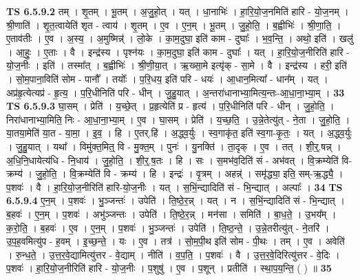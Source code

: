 \documentclass[17pt]{extarticle}
\begin{document}
                  \newline
                                \textbf{ TS 6.5.9.2} \newline
                  तम् । शृ॒तम् । भू॒तम् । अ॒जु॒हो॒त् । यत् । धा॒नाभिः॑ । हा॒रि॒यो॒ज॒नमिति॑ हारि - यो॒ज॒नम् । श्री॒णाति॑ । शृ॒त॒त्वायेति॑ शृत - त्वाय॑ । शृ॒तम् । ए॒व । ए॒न॒म् । भू॒तम् । जु॒हो॒ति॒ । ब॒ह्वीभिः॑ । श्री॒णा॒ति॒ । ए॒ताव॑तीः । ए॒व । अ॒स्य॒ । अ॒मुष्मिन्न्॑ । लो॒के । का॒म॒दुघा॒ इति॑ काम - दुघाः᳚ । भ॒व॒न्ति॒ । अथो॒ इति॑ । खलु॑ । आ॒हुः॒ । ए॒ताः । वै । इन्द्र॑स्य । पृश्न॑यः । का॒म॒दुघा॒ इति॑ काम - दुघाः᳚ । यत् । हा॒रि॒यो॒ज॒नीरिति॑ हारि - यो॒ज॒नीः । इति॑ । तस्मा᳚त् । ब॒ह्वीभिः॑ । श्री॒णी॒या॒त् । ऋ॒ख्सा॒मे इत्यृ॑क् - सा॒मे । वै । इन्द्र॑स्य । हरी॒ इति॑ । सो॒म॒पाना॒विति॑ सोम - पानौ᳚ । तयोः᳚ । प॒रि॒धय॒ इति॑ परि - धयः॑ । आ॒धान॒मित्या᳚ - धान᳚म् । यत् । अप्र॑हृ॒त्येत्यप्र॑ - हृ॒त्य॒ । प॒रि॒धीनिति॑ परि - धीन् । जु॒हु॒यात् । अ॒न्तरा॑धानाभ्या॒मित्य॒न्तः-आ॒धा॒ना॒भ्या॒म् । \textbf{  33} \newline
                  \newline
                                \textbf{ TS 6.5.9.3} \newline
                  घा॒सम् । प्रेति॑ । य॒च्छे॒त् । प्र॒हृत्येति॑ प्र - हृत्य॑ । प॒रि॒धीनिति॑ परि - धीन् । जु॒हो॒ति॒ । निरा॑धानाभ्या॒मिति॒ निः - आ॒धा॒ना॒भ्या॒म् । ए॒व । घा॒सम् । प्रेति॑ । य॒च्छ॒ति॒ । उ॒न्ने॒तेत्यु॑त् - ने॒ता । जु॒हो॒ति॒ । या॒तया॒मेति॑ या॒त - या॒मा॒ । इ॒व॒ । हि । ए॒तर्.हि॑ । अ॒द्ध्व॒र्युः । स्व॒गाकृ॑त॒ इति॑ स्व॒गा-कृ॒तः॒ । यत् । अ॒द्ध्व॒र्युः । जु॒हु॒यात् । यथा᳚ । विमु॑क्त॒मित्॒ वि - मु॒क्त॒म् । पुनः॑ । यु॒नक्ति॑ । ता॒दृक् । ए॒व । तत् । शी॒र्॒.षन्न् । अ॒धि॒नि॒धायेत्य॑धि - नि॒धाय॑ । जु॒हो॒ति॒ । शी॒र्॒.ष॒तः । हि । सः । स॒मभ॑व॒दिति॑ सं - अभ॑वत् । वि॒क्रम्येति॑ वि-क्रम्य॑ । जु॒हो॒ति॒ । वि॒क्रम्येति॑ वि - क्रम्य॑ । हि । इन्द्रः॑ । वृ॒त्रम् । अहन्न्॑ । समृ॑द्ध्या॒ इति॒ सम्-ऋ॒द्ध्यै॒ । प॒शवः॑ । वै । हा॒रि॒यो॒ज॒नीरिति॑ हारि-यो॒ज॒नीः । यत् । स॒भिं॒न्द्यादिति॑ सं - भि॒न्द्यात् । अल्पाः᳚ । \textbf{  34} \newline
                  \newline
                                \textbf{ TS 6.5.9.4} \newline
                  ए॒न॒म् । प॒शवः॑ । भु॒ञ्जन्तः॑ । उपेति॑ । ति॒ष्ठे॒र॒न्न् । यत् । न । स॒भिं॒न्द्यादिति॑ सं - भि॒न्द्यात् । ब॒हवः॑ । ए॒न॒म् । प॒शवः॑ । अभु॑ञ्जन्तः । उपेति॑ । ति॒ष्ठे॒र॒न्न् । मन॑सा । समिति॑ । बा॒ध॒ते॒ । उ॒भय᳚म् । क॒रो॒ति॒ । ब॒हवः॑ । ए॒व । ए॒न॒म् । प॒शवः॑ । भु॒ञ्जन्तः॑ । उपेति॑ । ति॒ष्ठ॒न्ते॒ । उ॒न्ने॒तरीत्यु॑त् - ने॒तरि॑ । उ॒प॒ह॒वमित्यु॑प - ह॒वम् । इ॒च्छ॒न्ते॒ । यः । ए॒व । तत्र॑ । सो॒म॒पी॒थ इति॑ सोम - पी॒थः । तम् । ए॒व । अवेति॑ । रु॒न्ध॒ते॒ । उ॒त्त॒र॒वे॒द्यामित्यु॑त्तर - वे॒द्याम् । नीति॑ । व॒प॒ति॒ । प॒शवः॑ । वै । उ॒त्त॒र॒वे॒दिरित्यु॑त्तर - वे॒दिः । प॒शवः॑ । हा॒रि॒यो॒ज॒नीरिति॑ हारि - यो॒ज॒नीः । प॒शुषु॑ । ए॒व । प॒शून् । प्रतीति॑ । स्था॒प॒य॒न्ति॒ ( ) ॥ \textbf{  35} \newline
\end{document}
